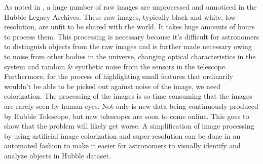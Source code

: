 \documentclass[10pt,twocolumn,letterpaper]{article}
\begin{document}
\hspace*{0.167 in}As noted in \cite{Gao2019astronomical}, a huge number of raw images are unprocessed and unnoticed in the Hubble Legacy Archives. These raw images, typically black and white, low-resolution, are unfit to be shared with the world. It takes huge amounts of hours to process them. This processing is necessary because it's difficult for astronomers to distinguish objects from the raw images and is further made necessary owing to noise from other bodies in the universe, changing optical characteristics in the system and random \& synthetic noise from the sensors in the telescope. Furthermore, for the process of highlighting small features that ordinarily wouldn't be able to be picked out against noise of the image, we need colorization. The processing of the images is so time consuming that the images are rarely seen by human eyes. Not only is new data being continuously produced by Hubble Telescope, but new telescopes are soon to come online. This goes to show that the problem will likely get worse. A simplification of image processing by using artificial image colorization and super-resolution can be done in an automated fashion to make it easier for astronomers to visually identify and analyze objects in Hubble dataset.
\end{document}
